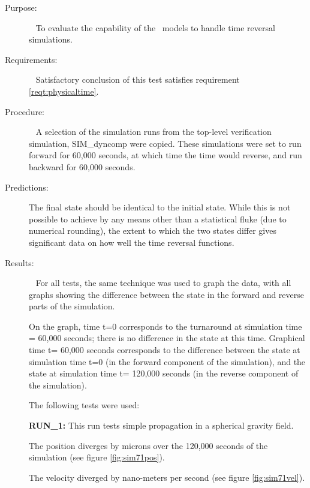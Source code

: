 \label{test:timereversal}
\begin{description}
\item[Purpose:] \ \newline
To evaluate the capability of the \JEODid\ models to handle time reversal 
simulations.
\item[Requirements:] \ \newline
Satisfactory conclusion of this test satisfies requirement 
\ref{reqt:physicaltime}.
\item[Procedure:]\ \newline
A selection of the simulation runs from the top-level verification simulation, 
SIM\_dyncomp were copied.  These simulations were set to run forward for 60,000 
seconds, at which time the time would reverse, and run backward for 60,000 
seconds.
\item[Predictions:]
The final state should be identical to the initial state.  While this is not 
possible to achieve by any means other than a statistical fluke (due to 
numerical rounding), the extent to which the two states differ gives 
significant data on how well the time reversal functions.
\item[Results:]\ \newline
For all tests, the same technique was used to graph the data, with all graphs 
showing the difference between the state in the forward and reverse parts of 
the simulation.  

On the graph, time t=0 corresponds to the turnaround at simulation time = 
60,000 seconds; there is no difference in the state at this time.  Graphical 
time t= 60,000 seconds corresponds to the difference between the state at 
simulation time t=0 (in the forward component of the simulation), and the state 
at simulation time t= 120,000 seconds (in the reverse component of the 
simulation).

The following tests were used:

{\bf RUN\_1:}
This run tests simple propagation in a spherical gravity field. 

The position diverges by microns over the 120,000 seconds of the simulation 
(see figure \ref{fig:sim71pos}).

The velocity diverged by nano-meters per second (see figure \ref{fig:sim71vel}).


\end{description}
